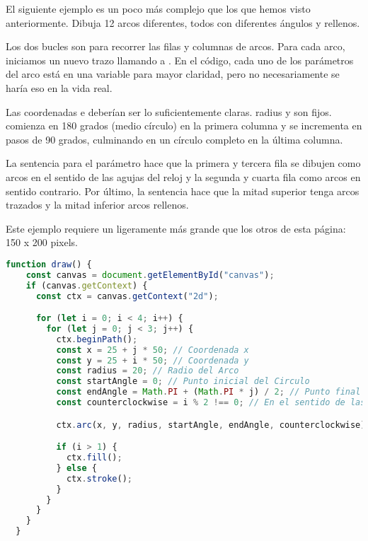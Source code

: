 El siguiente ejemplo es un poco más complejo que los que hemos visto anteriormente. Dibuja 12 arcos diferentes, todos con diferentes ángulos y rellenos.

Los dos bucles  son para recorrer las filas y columnas de arcos. Para cada arco, iniciamos un nuevo trazo llamando a . En el código, cada uno de los parámetros del arco está en una variable para mayor claridad, pero no necesariamente se haría eso en la vida real.

Las coordenadas  e  deberían ser lo suficientemente claras. radius y  son fijos.  comienza en 180 grados (medio círculo) en la primera columna y se incrementa en pasos de 90 grados, culminando en un círculo completo en la última columna.

La sentencia para el parámetro  hace que la primera y tercera fila se dibujen como arcos en el sentido de las agujas del reloj y la segunda y cuarta fila como arcos en sentido contrario. Por último, la sentencia  hace que la mitad superior tenga arcos trazados y la mitad inferior arcos rellenos.

\vspace{0.5cm} %
\begin{tcolorbox}
	[colback=red!5!white,colframe=cyan,fonttitle=\bfseries,title={\faLightbulbO\, Nota:}]

	Este ejemplo requiere un  ligeramente más grande que los otros de esta página:\\
	150 x 200 pixels.
\end{tcolorbox}
\vspace{0.5cm} %

\newpage %
\begin{lstlisting}[language=TypeScript, style=mystyle]
  function draw() {
    const canvas = document.getElementById("canvas");
    if (canvas.getContext) {
      const ctx = canvas.getContext("2d");

      for (let i = 0; i < 4; i++) {
        for (let j = 0; j < 3; j++) {
          ctx.beginPath();
          const x = 25 + j * 50; // Coordenada x
          const y = 25 + i * 50; // Coordenada y
          const radius = 20; // Radio del Arco
          const startAngle = 0; // Punto inicial del Circulo
          const endAngle = Math.PI + (Math.PI * j) / 2; // Punto final del Circulo
          const counterclockwise = i % 2 !== 0; // En el sentido de las agujas del reloj o en sentido contrario

          ctx.arc(x, y, radius, startAngle, endAngle, counterclockwise);

          if (i > 1) {
            ctx.fill();
          } else {
            ctx.stroke();
          }
        }
      }
    }
  }
\end{lstlisting}

